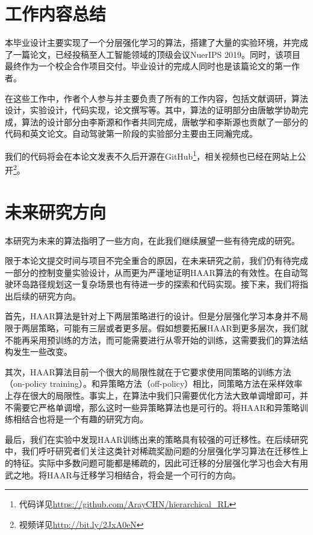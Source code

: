 \section{工作内容总结}
本毕业设计主要实现了一个分层强化学习的算法，搭建了大量的实验环境，并完成了一篇论文\cite{HAAR}，已经投稿至人工智能领域的顶级会议NuerIPS 2019。同时，该项目最终作为一个校企合作项目交付。毕业设计的完成人同时也是该篇论文的第一作者。

在这些工作中，作者个人参与并主要负责了所有的工作内容，包括文献调研，算法设计，实验设计，代码实现，论文撰写等。其中，算法的证明部分由唐敏学协助完成，算法的设计部分由李斯源和作者共同完成，唐敏学和李斯源也贡献了一部分的代码和英文论文。自动驾驶第一阶段的实验部分主要由王同瀚完成。

我们的代码将会在本论文发表不久后开源在GitHub\footnote{代码详见\url{https://github.com/ArayCHN/hierarchical_RL}}，相关视频也已经在网站上公开\footnote{视频详见\url{http://bit.ly/2JxA0eN}}。

\section{未来研究方向}
本研究为未来的算法指明了一些方向，在此我们继续展望一些有待完成的研究。

限于本论文提交时间与项目不完全重合的原因，在未来研究之前，我们仍有待完成一部分的控制变量实验设计，从而更为严谨地证明HAAR算法的有效性。在自动驾驶环岛路径规划这一复杂场景也有待进一步的探索和代码实现。接下来，我们将指出后续的研究方向。

首先，HAAR算法是针对上下两层策略进行的设计。但是分层强化学习本身并不局限于两层策略，可能有三层或者更多层。假如想要拓展HAAR到更多层次，我们就不能再采用预训练的方法，而可能需要进行从零开始的训练，这需要我们的算法结构发生一些改变。

其次，HAAR算法目前一个很大的局限性就在于它要求使用同策略的训练方法（on-policy training）。和异策略方法（off-policy）相比，同策略方法在采样效率上存在很大的局限性。事实上，在算法中我们只需要优化方法大致单调增即可，并不需要它严格单调增，那么这时一些异策略算法也是可行的。将HAAR和异策略训练相结合也将是一个有趣的研究方向。

最后，我们在实验中发现HAAR训练出来的策略具有较强的可迁移性。在后续研究中，我们呼吁研究者们关注这类针对稀疏奖励问题的分层强化学习算法在迁移性上的特征。实际中多数问题可能都是稀疏的，因此可迁移的分层强化学习也会大有用武之地。将HAAR与迁移学习相结合，将会是一个可行的方向。
